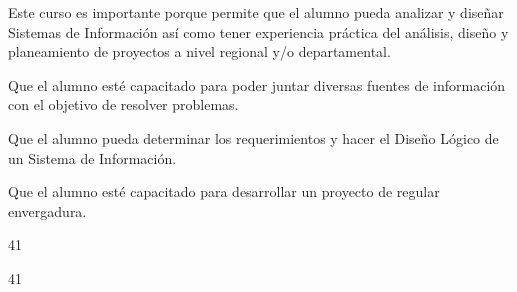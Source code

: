 \begin{syllabus}


\begin{justification}
Este curso es importante porque permite que el alumno pueda analizar y diseñar Sistemas de Información así­ como tener experiencia práctica del análisis, diseño y planeamiento de proyectos a nivel regional y/o departamental.
\end{justification}

\begin{goals}
\item Que el alumno esté capacitado para poder juntar diversas fuentes de información con el objetivo de resolver problemas.
\item Que el alumno pueda determinar los requerimientos y hacer el Diseño Lógico de un Sistema de Información.
\item Que el alumno esté capacitado para desarrollar un proyecto de regular envergadura.
\end{goals}

\begin{outcomes}
\end{outcomes}

\begin{unit}{\LUSEVENTWODef}{\LUSEVENTWOBib}{4}{1}
\begin{topics}
      \item \OMCONEOHTopicTWOxONEOHxONEOH
      \item \TDSSIXTopicTHREExSIXxONE
      \item \TDSSIXTopicTHREExSIXxTWO
      \item \TDSEIGHTTopicTHREExEIGHTxONE
\end{topics}
      \LUSEVENTWOGoal
\end{unit}

\begin{unit}{\LUSEVENTHREEDef}{\LUSEVENTHREEBib}{4}{1}
   \begin{topics}
	\item \OMCEIGHTTopicTWOxEIGHTxONE
	\item \OMCEIGHTTopicTWOxEIGHTxTWO
	\item \OMCEIGHTTopicTWOxEIGHTxTHREE
	\item \OMCEIGHTTopicTWOxEIGHTxFOUR
	\item \OMCEIGHTTopicTWOxEIGHTxFIVE
	\item \OMCEIGHTTopicTWOxEIGHTxSEVEN
	\item \TDSSEVENTopicTHREExSEVENxONEONE
   \end{topics}
	\LUSEVENTHREEGoal
\end{unit}


\end{syllabus}
